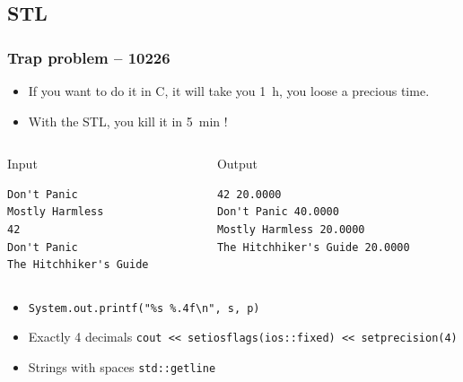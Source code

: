 \documentclass[10pt,svgnames,usenames,table]{beamer} %
\begin{document}
\subsection{STL}
\begin{frame}[fragile]
  \frametitle{Trap problem -- 10226}
  \begin{itemize}
    \item If you want to do it in C,
      it will take you \SI{1}{h}, you loose a precious time.
    \item With the STL, you kill it in \SI{5}{min} !
  \end{itemize}
  \begin{columns}
    \begin{column}{0.5\textwidth}
      \begin{block}{Input}
        \begin{verbatim}
Don't Panic
Mostly Harmless
42
Don't Panic
The Hitchhiker's Guide
        \end{verbatim}
      \end{block}
    \end{column}
    \begin{column}{0.5\textwidth}
      \begin{block}{Output}
        \begin{verbatim}
42 20.0000
Don't Panic 40.0000
Mostly Harmless 20.0000
The Hitchhiker's Guide 20.0000
        \end{verbatim}
      \end{block}
    \end{column}
  \end{columns}
  \begin{itemize}
    \item \lstinline|System.out.printf("%s %.4f\n", s, p)|
    \item Exactly 4 decimals \lstinline|cout << setiosflags(ios::fixed) << setprecision(4)|
    \item Strings with spaces \lstinline|std::getline|
  \end{itemize}
\end{frame}
\end{document}
